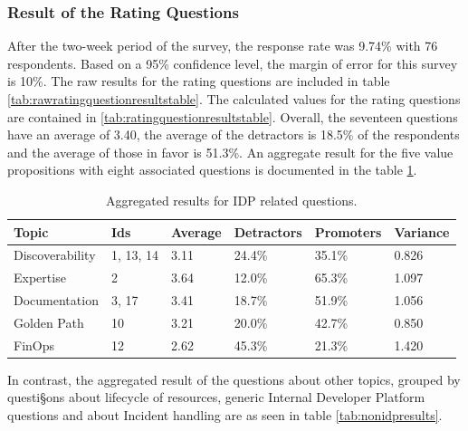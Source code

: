\documentclass[a4paper,12pt]{article}
\begin{document}
    \subsubsection{Result of the Rating Questions}
    \label{sssec:rratque}
    After the two-week period of the survey, the response rate was 9.74\% with 76 respondents.
    Based on a 95\% confidence level, the margin of error for this survey is 10\%.
    The raw results for the rating questions are included in table \ref{tab:rawratingquestionresultstable}.
    The calculated values for the rating questions are contained in \ref{tab:ratingquestionresultstable}.
    Overall, the seventeen questions have an average of 3.40, the average of the detractors is 18.5\% of the
    respondents and the average of those in favor is 51.3\%.
    An aggregate result for the five value propositions with eight associated questions is documented in the table \ref{tab:aggregateidpresults}.
    \begin{table}[!htbp]
        \begin{center}
            \begin{tabularx}{\textwidth}{llllll}
                \toprule
                Topic           & Ids       & Average & Detractors & Promoters & Variance \\
                \midrule
                Discoverability & 1, 13, 14 & 3.11    & 24.4\%     & 35.1\%    & 0.826    \\
                Expertise       & 2         & 3.64    & 12.0\%     & 65.3\%    & 1.097    \\
                Documentation   & 3, 17     & 3.41    & 18.7\%     & 51.9\%    & 1.056    \\
                Golden Path     & 10        & 3.21    & 20.0\%     & 42.7\%    & 0.850    \\
                FinOps          & 12        & 2.62    & 45.3\%     & 21.3\%    & 1.420    \\
                \bottomrule
            \end{tabularx}
        \end{center}
        \caption{\label{tab:aggregateidpresults} Aggregated results for IDP related questions.}
    \end{table}

    In contrast, the aggregated result of the questions about other topics, grouped by questi§ons about lifecycle of resources,
    generic Internal Developer Platform questions and about Incident handling are as seen in table \ref{tab:nonidpresults}.
\end{document}
